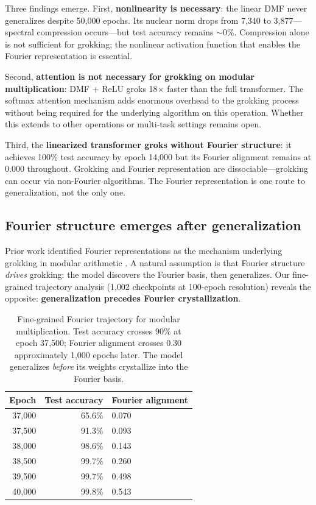 \documentclass{article}
\begin{document}
Three findings emerge. First, \textbf{nonlinearity is necessary}: the linear
DMF never generalizes despite 50{,}000 epochs. Its nuclear norm drops from
7{,}340 to 3{,}877---spectral compression occurs---but test accuracy remains
$\sim$0\%. Compression alone is not sufficient for grokking; the nonlinear
activation function that enables the Fourier representation is essential.

Second, \textbf{attention is not necessary for grokking on modular
multiplication}: DMF + ReLU groks 18$\times$ faster than the full
transformer. The softmax attention mechanism adds enormous overhead to the
grokking process without being required for the underlying algorithm on this
operation. Whether this extends to other operations or multi-task settings
remains open.

Third, the \textbf{linearized transformer groks without Fourier structure}:
it achieves 100\% test accuracy by epoch 14{,}000 but its Fourier alignment
remains at 0.000 throughout. Grokking and Fourier representation are
dissociable---grokking can occur via non-Fourier algorithms. The Fourier
representation is one route to generalization, not the only one.

\subsection{Fourier structure emerges after generalization}
\label{sec:fourier_trajectory}

Prior work identified Fourier representations as the mechanism underlying
grokking in modular arithmetic \citep{nanda2023progress, zhong2024clock}.
A natural assumption is that Fourier structure \emph{drives} grokking:
the model discovers the Fourier basis, then generalizes. Our fine-grained
trajectory analysis (1{,}002 checkpoints at 100-epoch resolution) reveals
the opposite: \textbf{generalization precedes Fourier crystallization}.

\begin{table}[t]
\centering
\small
\begin{tabular}{rrl}
\toprule
Epoch & Test accuracy & Fourier alignment \\
\midrule
37{,}000 & 65.6\% & 0.070 \\
37{,}500 & 91.3\% & 0.093 \\
38{,}000 & 98.6\% & 0.143 \\
38{,}500 & 99.7\% & 0.260 \\
39{,}500 & 99.7\% & 0.498 \\
40{,}000 & 99.8\% & 0.543 \\
\bottomrule
\end{tabular}
\caption{Fine-grained Fourier trajectory for modular multiplication.
Test accuracy crosses 90\% at epoch 37{,}500; Fourier alignment crosses 0.30
approximately 1{,}000 epochs later. The model generalizes \emph{before} its
weights crystallize into the Fourier basis.}
\label{tab:fourier_lag}
\end{table}
\end{document}
